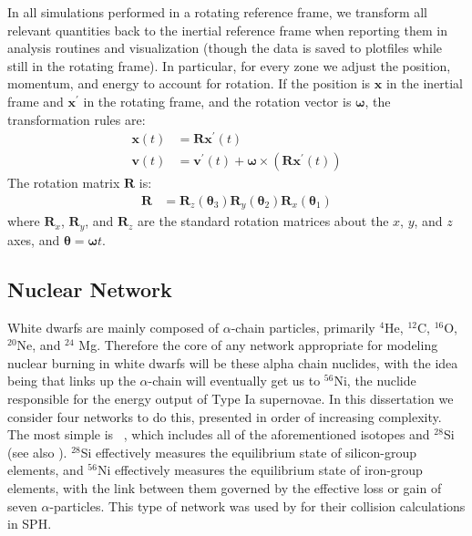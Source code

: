\documentclass[12pt]{article}
\begin{document}
In all simulations performed in a rotating reference frame, we transform all relevant
quantities back to the inertial reference frame when reporting them in analysis routines 
and visualization (though the data is saved to plotfiles while still in the rotating frame). In particular,
for every zone we adjust the position, momentum, and energy to account for rotation.
If the position is $\mathbf{x}$ in the inertial frame and $\mathbf{x}^\prime$ in 
the rotating frame, and the rotation vector is $\bm{\omega}$, the transformation rules are:
\begin{align}  
  \mathbf{x}(t) &= \mathbf{R}\mathbf{x}^\prime(t) \\
  \mathbf{v}(t) &= \mathbf{v}^\prime(t) + \bm{\omega} \times \left(\mathbf{R} \mathbf{x}^\prime(t)\right)
\end{align}
The rotation matrix $\mathbf{R}$ is:
\begin{align}
  \mathbf{R} &= \mathbf{R}_z({\bm{\theta}}_3) \mathbf{R}_y({\bm{\theta}}_2) \mathbf{R}_x({\bm{\theta}}_1)
\end{align}
where $\mathbf{R}_x$, $\mathbf{R}_y$, and $\mathbf{R}_z$ are the standard rotation matrices about 
the $x$, $y$, and $z$ axes, and $\bm{\theta} = \bm{\omega} t$.



\subsection{Nuclear Network}
\label{sec:network}

White dwarfs are mainly composed of $\alpha$-chain particles, primarily ${}^4$He,
${}^{12}$C, ${}^{16}$O, ${}^{20}$Ne, and ${}^{24}$ Mg. Therefore the core of
any network appropriate for modeling nuclear burning in white dwarfs will be
these alpha chain nuclides, with the idea being that links up the $\alpha$-chain
will eventually get us to ${}^{56}$Ni, the nuclide responsible for the
energy output of Type Ia supernovae. In this dissertation we consider four networks
to do this, presented in order of increasing complexity. The most simple is
\isoseven\ \citep{timmes:2000}, which includes all of the aforementioned isotopes and
${}^{28}$Si (see also \citet{hix:1998}). ${}^{28}$Si effectively measures the
equilibrium state of silicon-group elements, and ${}^{56}$Ni effectively measures
the equilibrium state of iron-group elements, with the link between them governed
by the effective loss or gain of seven $\alpha$-particles. This type of network
was used by \citet{rosswog:2009} for their collision calculations in SPH.
\end{document}
